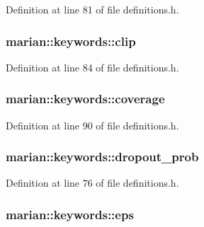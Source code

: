 Definition at line 81 of file definitions.\+h.

\subsubsection[{\texorpdfstring{clip}{clip}}]{ marian\+::keywords\+::clip}\hypertarget{namespacemarian_1_1keywords_a1ce7910671af4bcc0573570988101938}{}\label{namespacemarian_1_1keywords_a1ce7910671af4bcc0573570988101938}


Definition at line 84 of file definitions.\+h.

\subsubsection[{\texorpdfstring{coverage}{coverage}}]{ marian\+::keywords\+::coverage}\hypertarget{namespacemarian_1_1keywords_a3e4ed89478e91951088b10fd39c1866d}{}\label{namespacemarian_1_1keywords_a3e4ed89478e91951088b10fd39c1866d}


Definition at line 90 of file definitions.\+h.

\subsubsection[{\texorpdfstring{dropout\+\_\+prob}{dropout_prob}}]{ marian\+::keywords\+::dropout\+\_\+prob}\hypertarget{namespacemarian_1_1keywords_aeb1a41f81a79487b23aa2f8769a205bf}{}\label{namespacemarian_1_1keywords_aeb1a41f81a79487b23aa2f8769a205bf}


Definition at line 76 of file definitions.\+h.

\subsubsection[{\texorpdfstring{eps}{eps}}]{ marian\+::keywords\+::eps}\hypertarget{namespacemarian_1_1keywords_a94a12c2471667d9574d8b013796ec1cc}{}\label{namespacemarian_1_1keywords_a94a12c2471667d9574d8b013796ec1cc}


